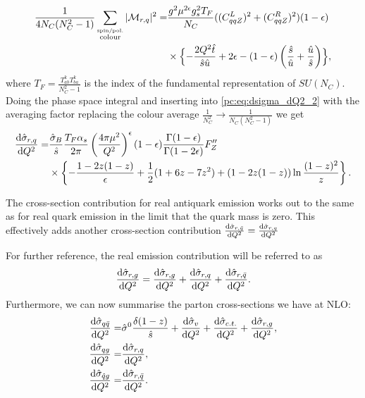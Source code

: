 \documentclass[../main.tex]{subfiles}
\begin{document}
\begin{align}
  \nonumber
  \frac{1}{4N_C(N_C^2-1)} \sum_{\stackrel{\text{spin/pol.}}{\text{colour}}}|\M_{r,q}|^2 = & \frac{g^2 \mu^{2\epsilon} g_s^2 T_F}{N_C} ((C_{qqZ}^L)^2 + (C_{qqZ}^R)^2) (1-\epsilon) \\
                                                                                          & \times\Bigl\{
  -\frac{2Q^2 \hat{t}}{\hat{s} \hat{u}} + 2\epsilon - (1-\epsilon)\pclosed{\frac{\hat{s}}{\hat{u}} + \frac{\hat{u}}{\hat{s}}}
  \Bigr\},
\end{align}
where \(T_F = \frac{T^k_{ab} T^{k}_{ba}}{N_C^2-1}\) is the index of the fundamental representation of \(SU(N_C)\).
Doing the phase space integral and inserting into \cref{pc:eq:dsigma_dQ2_2} with the averaging factor replacing the colour average \(\frac{1}{N_C^2} \to \frac{1}{N_C(N_C^2-1)}\) we get
\begin{align}
  \label{pc:eq:sigma_qg}
  \nonumber
  \d[Q^2]{\hat\sigma_{r,q}} = & \frac{\hat\sigma_B}{\hat{s}} \frac{T_F \alpha_s}{2\pi} \pclosed{\frac{4\pi \mu^2}{Q^2}}^\epsilon (1-\epsilon) \frac{\Gamma(1-\epsilon)}{\Gamma(1-2\epsilon)} F^{\prime\prime}_Z \\
                              & \times \cclosed{-\frac{1-2z(1-z)}{\epsilon} + \frac{1}{2}(1+6z-7z^2) + (1-2z(1-z))\ln\frac{(1-z)^2}{z}}.
\end{align}

The cross-section contribution for real antiquark emission works out to the same as for real quark emission in the limit that the quark mass is zero.
This effectively adds another cross-section contribution \(\d[Q^2]{\hat\sigma_{r,\bar{q}}} = \d[Q^2]{\hat\sigma_{r,q}}\)

For further reference, the real emission contribution will be referred to as
\begin{equation}
  \d[Q^2]{\hat\sigma_{r,g}} = \d[Q^2]{\hat\sigma_{r,g}} + \d[Q^2]{\hat\sigma_{r,q}} + \d[Q^2]{\hat\sigma_{r,\bar{q}}}.
\end{equation}
Furthermore, we can now summarise the parton cross-sections we have at NLO:
\begin{subequations}
  \begin{align}
    \d[Q^2]{\hat\sigma_{q\bar{q}}} = & \hat\sigma^0 \frac{\delta(1-z)}{\hat{s}} + \d[Q^2]{\hat\sigma_v} + \d[Q^2]{\hat\sigma_{c.t.}} + \d[Q^2]{\hat\sigma_{r,g}}, \\
    \d[Q^2]{\hat\sigma_{qg}} =       & \d[Q^2]{\hat\sigma_{r,q}},                                                                                                 \\
    \d[Q^2]{\hat\sigma_{\hat{q}g}} = & \d[Q^2]{\hat\sigma_{r,\bar{q}}}.
  \end{align}
\end{subequations}
\end{document}
